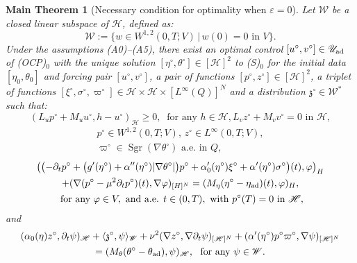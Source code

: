 \documentclass{sinst}
\numberwithin{equation}{section}
\theoremstyle{plain}
\newtheorem{mTh}{Main Theorem}
\theoremstyle{definition}
\def\sH{\mathscr{H}}
\def\sU{\mathscr{U}}
\def\sW{\mathscr{W}}
\def\ad{{\rm ad}}
\def\Sgn{\mathop{\mathrm{Sgr}}\nolimits}
\begin{document}
\begin{mTh}[Necessary condition for optimality when $\varepsilon = 0$] \label{mth4}
  Let $\sW$ be a closed linear subspace of $\sH$, defined as:
  \begin{equation}
    \sW := \{ w \in W^{1,2}(0,T;V) \,|\, w(0) = 0 \mbox{ in } V \}.
  \end{equation}
  Under the assumptions (A0)--(A5), there exist an optimal control $[u^\circ, v^\circ] \in \sU_\ad$ of (OCP)$_0$ with the unique solution $[\eta^\circ, \theta^\circ] \in [\sH]^2$ to (S)$_0$ for the initial data $[\eta_0, \theta_0]$ and forcing pair $[u^\circ, v^\circ]$, a pair of functions $[p^\circ, z^\circ] \in [\sH]^2$, a triplet of functions $[\xi^\circ, \sigma^\circ, \varpi^\circ] \in \sH \times \sH \times [L^\infty(Q)]^N$ and a distribution $\mathfrak{z}^\circ \in \sW^*$ such that:
  \begin{subequations} \label{mth4_01}
    \begin{equation}
    (L_u p^\circ + M_u u^\circ, h - u^\circ)_\sH \geq 0, \ \mbox{ for any } h \in \sH, \label{mth4_01a}
  \end{equation}
  \begin{equation}
    L_v z^\circ + M_v v^\circ = 0 \mbox{ in } \sH, \label{mth4_01b}
  \end{equation}
  \end{subequations}
  \begin{gather}
    p^\circ \in W^{1,2}(0,T;V), \, z^\circ \in L^\infty(0,T;V), \label{mth4_02}
    \\
    \varpi^\circ \in \Sgn(\nabla \theta^\circ) \mbox{ a.e. in } Q,
  \end{gather}
  \begin{gather}
    \bigl( \bigl( -\partial_t p^\circ + \bigl( g'(\eta^\circ)+ \alpha''(\eta^\circ) |\nabla \theta^\circ| \bigr) p^\circ + \alpha_0'(\eta^\circ) \xi^\circ + \alpha'(\eta^\circ) \sigma^\circ \bigr)(t), \varphi \bigr)_H 
    \\
    + (\nabla (p^\circ - \mu^2 \partial_t p^\circ)(t), \nabla \varphi)_{[H]^N} = (M_\eta(\eta^\circ - \eta_\ad)(t), \varphi)_H, \label{mth4_03}
    \\
    \mbox{ for any } \varphi \in V, \mbox{ and a.e. } t \in (0,T), \mbox{ with } p^\circ(T) = 0 \mbox{ in } \sH,
  \end{gather}
  and
  \begin{gather}
    (\alpha_0(\eta) z^\circ, \partial_t \psi)_\sH + \langle \mathfrak{z}^\circ, \psi \rangle_\sW + \nu^2(\nabla z^\circ, \nabla \partial_t \psi )_{[\sH]^N} + (\alpha'(\eta^\circ) p^\circ \varpi^\circ, \nabla \psi)_{[\sH]^N} 
    \\
    = (M_\theta (\theta^\circ - \theta_\ad), \psi)_\sH, \ \mbox{ for any } \psi \in \sW. \label{mth4_04}
  \end{gather}
\end{mTh}
\end{document}
